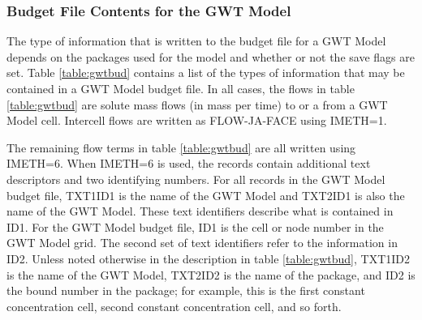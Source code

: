\newpage
\subsubsection{Budget File Contents for the GWT Model}

The type of information that is written to the budget file for a GWT Model depends on the packages used for the model and whether or not the save flags are set.  Table \ref{table:gwtbud} contains a list of the types of information that may be contained in a GWT Model budget file.  In all cases, the flows in table \ref{table:gwtbud} are solute mass flows (in mass per time) to or a from a GWT Model cell.  Intercell flows are written as FLOW-JA-FACE using IMETH=1.

The remaining flow terms in table \ref{table:gwtbud} are all written using IMETH=6.  When IMETH=6 is used, the records contain additional text descriptors and two identifying numbers.  For all records in the GWT Model budget file, TXT1ID1 is the name of the GWT Model and TXT2ID1 is also the name of the GWT Model.  These text identifiers describe what is contained in ID1.  For the GWT Model budget file, ID1 is the cell or node number in the GWT Model grid.  The second set of text identifiers refer to the information in ID2.  Unless noted otherwise in the description in table \ref{table:gwtbud}, TXT1ID2 is the name of the GWT Model, TXT2ID2 is the name of the package, and ID2 is the bound number in the package; for example, this is the first constant concentration cell, second constant concentration cell, and so forth.  


